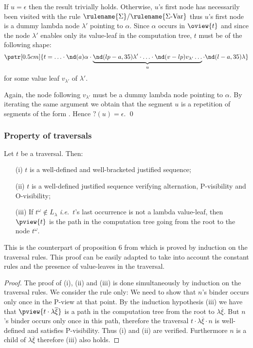 If $u=\epsilon$  then the result trivially holds. Otherwise, $u$'s
first node has necessarily been visited with the rule
$\rulename{\Sigma}/\rulename{\Sigma\mbox{-Var}}$ thus $u$'s first
node is a dummy lambda node $\lambda'$ pointing to $\alpha$. Since
$\alpha$ occurs in $\oview{t}$ and since the node $\lambda'$ enables
only its value-leaf in the computation tree, $t$ must be of the
following shape:
$$\pstr[0.5cm]{ t = \ldots \cdot \nd(a){\alpha} \cdot \underbrace{\nd(lp-a,35){\lambda'} \cdot  \ldots \cdot \nd(v-lp){v_{\lambda'}} \ldots }_{u} \cdot
 \nd(l-a,35){\lambda}}$$
for some value leaf $v_{\lambda'}$ of $\lambda'$.

Again, the node following $v_{\lambda'}$ must be a dummy lambda node
pointing to $\alpha$. By iterating the same argument we obtain that
the segment $u$ is a repetition of segments of the form
.
Hence $?(u)=\epsilon$. \qed



\subsubsection{Property of traversals}

\begin{proposition}
\label{prop:pviewtrav_is_path}
Let $t$ be a traversal. Then:
\begin{itemize}
\item[(i)] $t$ is a well-defined and well-bracketed justified sequence;
\item[(ii)] $t$ is a well-defined justified sequence verifying alternation, P-visibility and O-visibility;
\item[(iii)] If $t^\omega \not\in L_\lambda$ {\it i.e.}~$t$'s last occurrence is not a lambda value-leaf, then $\pview{t}$ is the path in the computation tree going from the root to the node $t^\omega$.
\end{itemize}
\end{proposition}

This is the counterpart of proposition 6 from
\cite{OngHoMchecking2006} which is proved by induction on the
traversal rules. This proof can be easily adapted to take into
account the constant rules and the presence of value-leaves in the
traversal.
\begin{proof}
The proof of (i), (ii) and (iii) is done simultaneously by induction on the traversal rules. We consider the rule  only:
We need to show that $n$'s binder occurs only once in the P-view at that point. By the induction hypothesis (iii) we have that $\pview{t \cdot \lambda \overline{\xi}}$ is a path in the computation tree from the root to $\lambda \overline{\xi}$. But $n$'s binder occurs only once in this path, therefore the traversal $t \cdot \lambda \overline{\xi} \cdot n$ is well-defined and satisfies P-visibility. Thus (i) and (ii) are verified. Furthermore $n$ is a child of $\lambda \overline{\xi}$ therefore (iii) also holds.
\end{proof}

